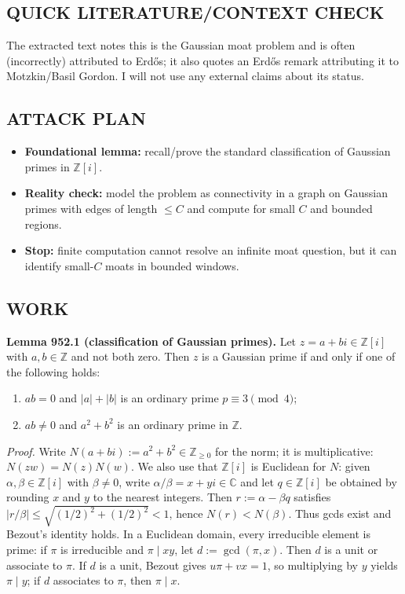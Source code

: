 \subsection*{QUICK LITERATURE/CONTEXT CHECK}
The extracted text notes this is the Gaussian moat problem and is often (incorrectly) attributed to Erd\H{o}s; it also quotes an Erd\H{o}s remark attributing it to Motzkin/Basil Gordon.
I will not use any external claims about its status.

\subsection*{ATTACK PLAN}
\begin{itemize}
\item \textbf{Foundational lemma:} recall/prove the standard classification of Gaussian primes in $\mathbb Z[i]$.
\item \textbf{Reality check:} model the problem as connectivity in a graph on Gaussian primes with edges of length $\le C$ and compute for small $C$ and bounded regions.
\item \textbf{Stop:} finite computation cannot resolve an infinite moat question, but it can identify small-$C$ moats in bounded windows.
\end{itemize}

\subsection*{WORK}
\noindent\textbf{Lemma 952.1 (classification of Gaussian primes).}
Let $z=a+bi\in\mathbb Z[i]$ with $a,b\in\mathbb Z$ and not both zero.
Then $z$ is a Gaussian prime if and only if one of the following holds:
\begin{enumerate}
\item $ab=0$ and $|a|+|b|$ is an ordinary prime $p\equiv 3\pmod 4$;
\item $ab\ne0$ and $a^2+b^2$ is an ordinary prime in $\mathbb Z$.
\end{enumerate}

\medskip
\noindent\emph{Proof.}
Write $N(a+bi):=a^2+b^2\in\mathbb Z_{\ge0}$ for the norm; it is multiplicative: $N(zw)=N(z)N(w)$.
We also use that $\mathbb Z[i]$ is Euclidean for $N$: given $\alpha,\beta\in\mathbb Z[i]$ with $\beta\ne0$, write $\alpha/\beta=x+yi\in\mathbb C$ and let $q\in\mathbb Z[i]$ be obtained by rounding $x$ and $y$ to the nearest integers. Then $r:=\alpha-\beta q$ satisfies $|r/\beta|\le \sqrt{(1/2)^2+(1/2)^2}<1$, hence $N(r)<N(\beta)$. Thus gcds exist and Bezout's identity holds.
In a Euclidean domain, every irreducible element is prime: if $\pi$ is irreducible and $\pi\mid xy$, let $d:=\gcd(\pi,x)$. Then $d$ is a unit or associate to $\pi$. If $d$ is a unit, Bezout gives $u\pi+vx=1$, so multiplying by $y$ yields $\pi\mid y$; if $d$ associates to $\pi$, then $\pi\mid x$.

